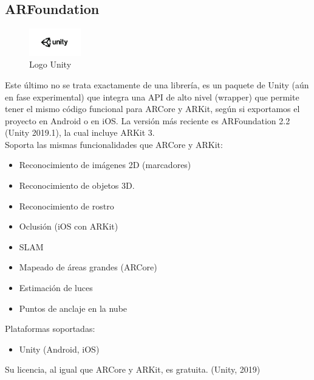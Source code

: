 \subsection{ARFoundation}
\begin{figure}[H]
    \centering
    \includegraphics[width=0.2\textwidth]{Images/Unity_Logo.jpeg}
    \caption{Logo Unity}
    \label{fig:my_label}
\end{figure}

Este último no se trata exactamente de una librería, es un paquete de Unity (aún en fase experimental) que integra una API de alto nivel (wrapper) que permite tener el mismo código funcional para ARCore y ARKit, según si exportamos el proyecto en Android o en iOS. La versión más reciente es ARFoundation 2.2 (Unity 2019.1), la cual incluye ARKit 3.\\
Soporta las mismas funcionalidades que ARCore y ARKit:
\begin{itemize}
\item Reconocimiento de imágenes 2D (marcadores)
\item Reconocimiento de objetos 3D.
\item Reconocimiento de rostro 
\item Oclusión (iOS con ARKit)
\item SLAM
\item Mapeado de áreas grandes (ARCore)
\item Estimación de luces
\item Puntos de anclaje en la nube
\end{itemize}

Plataformas soportadas:
\begin{itemize}
\item Unity (Android, iOS)
\end{itemize}

Su licencia, al igual que ARCore y ARKit, es gratuita.
(Unity, 2019)



\noindent
